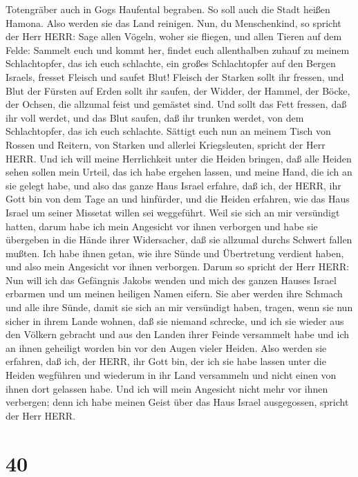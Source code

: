 Totengräber auch in Gogs Haufental begraben.  So soll auch
die Stadt heißen Hamona. Also werden sie das Land reinigen.
 Nun, du Menschenkind, so spricht der Herr HERR: Sage allen
Vögeln, woher sie fliegen, und allen Tieren auf dem Felde: Sammelt euch
und kommt her, findet euch allenthalben zuhauf zu meinem Schlachtopfer,
das ich euch schlachte, ein großes Schlachtopfer auf den Bergen Israels,
fresset Fleisch und saufet Blut!  Fleisch der Starken sollt
ihr fressen, und Blut der Fürsten auf Erden sollt ihr saufen, der
Widder, der Hammel, der Böcke, der Ochsen, die allzumal feist und
gemästet sind.  Und sollt das Fett fressen, daß ihr voll
werdet, und das Blut saufen, daß ihr trunken werdet, von dem
Schlachtopfer, das ich euch schlachte.  Sättigt euch nun an
meinem Tisch von Rossen und Reitern, von Starken und allerlei
Kriegsleuten, spricht der Herr HERR.  Und ich will meine
Herrlichkeit unter die Heiden bringen, daß alle Heiden sehen sollen mein
Urteil, das ich habe ergehen lassen, und meine Hand, die ich an sie
gelegt habe,  und also das ganze Haus Israel erfahre, daß
ich, der HERR, ihr Gott bin von dem Tage an und hinfürder, 
und die Heiden erfahren, wie das Haus Israel um seiner Missetat willen
sei weggeführt. Weil sie sich an mir versündigt hatten, darum habe ich
mein Angesicht vor ihnen verborgen und habe sie übergeben in die Hände
ihrer Widersacher, daß sie allzumal durchs Schwert fallen mußten.
 Ich habe ihnen getan, wie ihre Sünde und Übertretung
verdient haben, und also mein Angesicht vor ihnen verborgen.
 Darum so spricht der Herr HERR: Nun will ich das Gefängnis
Jakobs wenden und mich des ganzen Hauses Israel erbarmen und um meinen
heiligen Namen eifern.  Sie aber werden ihre Schmach und
alle ihre Sünde, damit sie sich an mir versündigt haben, tragen, wenn
sie nun sicher in ihrem Lande wohnen, daß sie niemand schrecke,
 und ich sie wieder aus den Völkern gebracht und aus den
Landen ihrer Feinde versammelt habe und ich an ihnen geheiligt worden
bin vor den Augen vieler Heiden.  Also werden sie erfahren,
daß ich, der HERR, ihr Gott bin, der ich sie habe lassen unter die
Heiden wegführen und wiederum in ihr Land versammeln und nicht einen von
ihnen dort gelassen habe.  Und ich will mein Angesicht
nicht mehr vor ihnen verbergen; denn ich habe meinen Geist über das Haus
Israel ausgegossen, spricht der Herr HERR.

\hypertarget{section-39}{%
\section{40}\label{section-39}}

